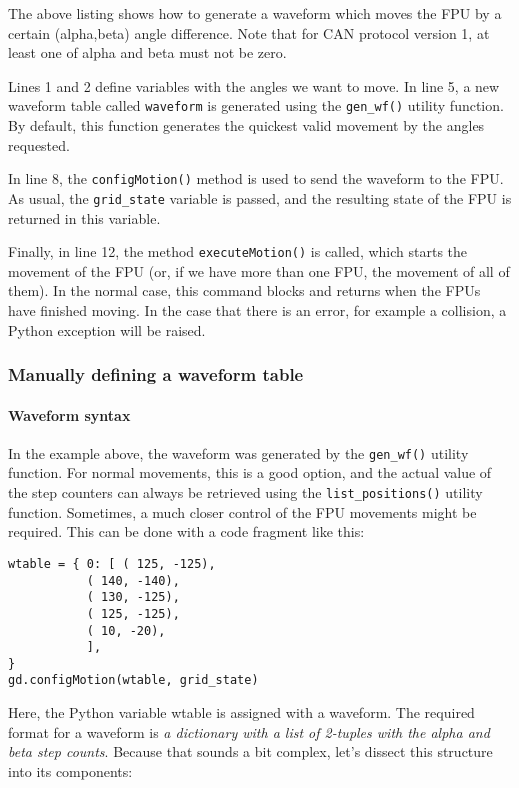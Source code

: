 \documentclass{scrartcl}[12pt,a4paper]
\begin{document}
The above listing shows how to generate a waveform which moves the FPU
by a certain (alpha,beta) angle difference. Note that for CAN protocol
version 1, at least one of alpha and beta must not be zero.

Lines 1 and 2 define variables with the angles we want to move. In
line 5, a new waveform table called \texttt{waveform} is generated
using the \texttt{gen\_wf()} utility function.  By default, this
function generates the quickest valid movement by the angles
requested.

In line 8, the \texttt{configMotion()} method is used to send the
waveform to the FPU. As usual, the \texttt{grid\_state} variable is
passed, and the resulting state of the FPU is returned in this
variable.

Finally, in line 12, the method \texttt{executeMotion()} is called,
which starts the movement of the FPU (or, if we have more than one
FPU, the movement of all of them). In the normal case, this command
blocks and returns when the FPUs have finished moving.  In the case
that there is an error, for example a collision, a Python exception
will be raised.



\subsubsection{Manually defining a waveform table}

\paragraph{Waveform syntax}

In the example above, the waveform was generated by the
\texttt{gen\_wf()} utility function.  For normal movements, this is a
good option, and the actual value of the step counters can always be
retrieved using the \texttt{list\_positions()} utility
function. Sometimes, a much closer control of the FPU movements might
be required. This can be done with a code fragment like this:

\begin{verbatim}
wtable = { 0: [ ( 125, -125),
           ( 140, -140),
           ( 130, -125),
           ( 125, -125),
           ( 10, -20),
           ],
}
gd.configMotion(wtable, grid_state)
\end{verbatim}

Here, the Python variable wtable is assigned with
a waveform. The required format for a waveform
is \emph{a dictionary with a list of 2-tuples
  with the alpha and beta step counts}. Because
that sounds a bit complex, let's dissect this
structure into its components:
\end{document}
